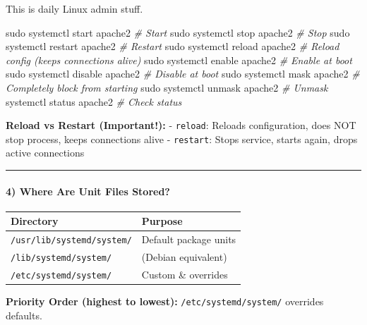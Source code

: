 \documentclass[
  english,
  paper=a4,
  oneside  ,captions=tableheading
]{scrartcl}
\newenvironment{Shaded}{}{}
\newcommand{\CommentTok}[1]{\textcolor[rgb]{0.38,0.63,0.69}{\textit{#1}}}
\newcommand{\ExtensionTok}[1]{#1}
\newcommand{\FunctionTok}[1]{\textcolor[rgb]{0.02,0.16,0.49}{#1}}
\newcommand{\NormalTok}[1]{#1}
\newcounter{none} %
\begin{document}
This is daily Linux admin stuff.

\begin{Shaded}
\begin{Highlighting}[]
\FunctionTok{sudo}\NormalTok{ systemctl start apache2       }\CommentTok{\# Start}
\FunctionTok{sudo}\NormalTok{ systemctl stop apache2        }\CommentTok{\# Stop}
\FunctionTok{sudo}\NormalTok{ systemctl restart apache2     }\CommentTok{\# Restart}
\FunctionTok{sudo}\NormalTok{ systemctl reload apache2      }\CommentTok{\# Reload config (keeps connections alive)}
\FunctionTok{sudo}\NormalTok{ systemctl enable apache2      }\CommentTok{\# Enable at boot}
\FunctionTok{sudo}\NormalTok{ systemctl disable apache2     }\CommentTok{\# Disable at boot}
\FunctionTok{sudo}\NormalTok{ systemctl mask apache2        }\CommentTok{\# Completely block from starting}
\FunctionTok{sudo}\NormalTok{ systemctl unmask apache2      }\CommentTok{\# Unmask}
\ExtensionTok{systemctl}\NormalTok{ status apache2           }\CommentTok{\# Check status}
\end{Highlighting}
\end{Shaded}

\textbf{Reload vs Restart (Important!):} - \texttt{reload}: Reloads
configuration, does NOT stop process, keeps connections alive -
\texttt{restart}: Stops service, starts again, drops active connections

\begin{center}\rule{0.5\linewidth}{0.5pt}\end{center}

\paragraph{4) Where Are Unit Files
Stored?}\label{where-are-unit-files-stored}

{\def\LTcaptype{none} %
\begin{longtable}[]{@{}ll@{}}
\toprule\noalign{}
Directory & Purpose \\
\midrule\noalign{}
\endhead
\bottomrule\noalign{}
\endlastfoot
\texttt{/usr/lib/systemd/system/} & Default package units \\
\texttt{/lib/systemd/system/} & (Debian equivalent) \\
\texttt{/etc/systemd/system/} & Custom \& overrides \\
\end{longtable}
}

\textbf{Priority Order (highest to lowest):}
\texttt{/etc/systemd/system/} overrides defaults.
\end{document}
